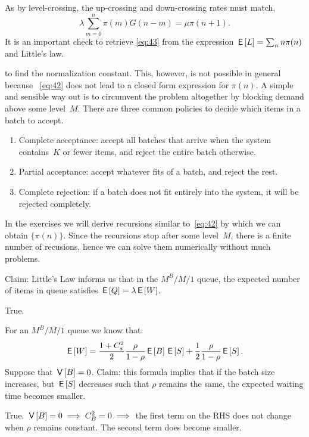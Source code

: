 \documentclass[stochastic-or.tex]{subfiles}
\begin{document}
As by level-crossing, the up-crossing and down-crossing rates must match,
\begin{equation}\label{eq:42}
\lambda \sum_{m=0}^n \pi(m) G(n-m) = \mu \pi(n+1).
\end{equation}
It is an important check to retrieve \cref{eq:43} from the expression $\,\mathsf{E}\left[L\right] = \sum_{n} n \pi(n)$ and Little's law.

 to find the normalization constant.
This, however, is not possible in general because ~\cref{eq:42} does not lead to a closed form expression for $\pi(n)$.
A simple and sensible way out is to circumvent the problem altogether by blocking demand above some level~$M$.
There are three common policies to decide which items in a batch to accept.
\begin{enumerate}
\item Complete acceptance: accept all batches that arrive when the system contains~$K$ or fewer items, and reject the entire batch otherwise.
\item Partial acceptance: accept whatever fits of a batch, and reject the rest.
\item Complete rejection: if a batch does not fit entirely into the system, it will be rejected completely.
\end{enumerate}
In the exercises we will derive recursions similar to~\cref{eq:42} by which we can obtain $\{\pi(n)\}$.
Since the recursions stop after some level~$M$, there is a finite number of recusions, hence we can solve them numerically without much problems.


\begin{truefalse}
Claim:   Little's Law informs us that in the $M^{B}/M/1$ queue, the expected number of items in queue satisfies $\,\mathsf{E}\left[Q\right]=\lambda\,\mathsf{E}\left[W\right]$.
    \begin{solution}
        True.
    \end{solution}
\end{truefalse}

\begin{truefalse}
    For an $M^B/M/1$ queue we know that:
    $$
    \,\mathsf{E}\left[W\right]=\frac{1+C_s^2}{2}\frac{\rho}{1-\rho}\,\mathsf{E}\left[B\right]\,\mathsf{E}\left[S\right]+\frac{1}{2}\frac{\rho}{1-\rho}\,\mathsf{E}\left[S\right].
    $$
    Suppose that $\,\mathsf{V}\left[B\right] = 0$.
    Claim: this formula implies that if the batch size increases, but $\,\mathsf{E}\left[S\right]$ decreases such that $\rho$ remains the same, the expected waiting time becomes smaller.

    \begin{solution}
        True. $\,\mathsf{V}\left[B\right] = 0 \implies C_{B}^{2} = 0 \implies$ the first term on the RHS does not change when $\rho$ remains constant. The second term does become smaller.
    \end{solution}
\end{truefalse}
\end{document}
